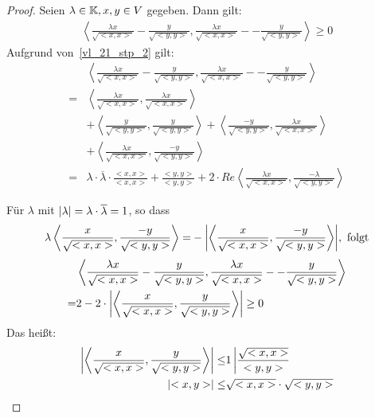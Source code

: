 \begin{proof}
	Seien $\lambda \in \mathbb{K}, x,y \in V$ gegeben. 
	Dann gilt:
	\begin{align*}
		\left< \frac{\lambda x}{\sqrt{<x,x>}} - \frac{y}{\sqrt{<y,y>}} , 
		 \frac{\lambda x}{\sqrt{<x,x>}} - - \frac{y}{\sqrt{<y,y>}} \right> \geq 0
	\end{align*}
	Aufgrund von~\ref{vl_21_stp_2} gilt:
	\begin{align*}
	 & \left< \frac{\lambda x}{\sqrt{<x,x>}} - \frac{y}{\sqrt{<y,y>}} , 
		 \frac{\lambda x}{\sqrt{<x,x>}} - - \frac{y}{\sqrt{<y,y>}} \right> \\
	= &
	\left< \frac{\lambda x}{\sqrt{<x,x>}}, \frac{\lambda x}{\sqrt{<x,x>}} \right> \\
		& + \left< \frac{y}{\sqrt{<y,y>}}, \frac{y}{\sqrt{<y,y>}} \right> 
		+ \left< \frac{-y}{\sqrt{<y,y>}}, \frac{\lambda x}{\sqrt{<x,x>}} \right> \\
		&+ \left< \frac{\lambda x}{\sqrt{<x,x>}}, \frac{-y}{\sqrt{<y,y>}}\right> \\
	= & \lambda \cdot \overline{\lambda} \cdot \frac{<x,x>}{<x,x>} + \frac{<y,y>}{<y,y>} 
		+ 2 \cdot Re \left< \frac{\lambda x}{\sqrt{<x,x>}}, \frac{-\lambda }{\sqrt{<y,y>}} \right>
	\end{align*}

Für $\lambda$ mit $\abs{\lambda} = \lambda \cdot \overline{\lambda} = 1$, so 
	dass
	\begin{align*}
		\lambda \left< \frac{x}{\sqrt{<x,x>}}, \frac{-y}{\sqrt{<y,y>}} \right>
		= & - \abs{ \left< \frac{x}{\sqrt{<x,x>}}, \frac{-y}{\sqrt{<y,y>}} 
			\right> }, \text{ folgt} \\
	\end{align*}
	\begin{align*}
		& \left< \frac{\lambda x}{\sqrt{<x,x>}} - \frac{y}{\sqrt{<y,y>}} , 
		 \frac{\lambda x}{\sqrt{<x,x>}} - - \frac{y}{\sqrt{<y,y>}} \right> \\
		= & 2 - 2 \cdot \abs{ \left< \frac{x}{\sqrt{<x,x>}}, \frac{y}{\sqrt{<y,y>}} 
		 \right>} \geq 0
	\end{align*} 
	Das heißt:
	\begin{align*}
		\abs{\left< \frac{x}{\sqrt{<x,x>}} , \frac{y}{\sqrt{<y,y>}} \right>} \leq & 1 
		\left\vert \frac{\sqrt{<x,x>}}{<y,y>}\right. \\
		\abs{<x,y>} \leq & \sqrt{<x,x>} \cdot \sqrt{<y,y>}
	\end{align*}
\end{proof}

